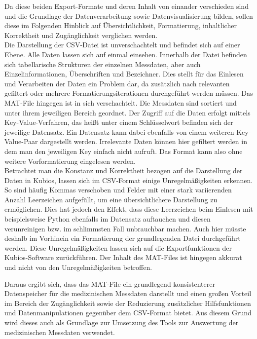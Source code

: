 Da diese beiden Export-Formate und deren Inhalt von einander verschieden sind und die Grundlage der Datenverarbeitung sowie Datenvisualisierung bilden, sollen diese im Folgenden Hinblick auf Übersichtlichkeit, Formatierung, inhaltlicher Korrektheit und Zugänglichkeit verglichen werden.\\
Die Darstellung der CSV-Datei ist unverschachtelt und befindet sich auf einer Ebene. Alle Daten lassen sich auf einmal einsehen. Innerhalb der Datei befinden sich tabellarische Strukturen der einzelnen Messdaten, aber auch Einzelinformationen, Überschriften und Bezeichner. Dies stellt für das Einlesen und Verarbeiten der Daten ein Problem dar, da zusätzlich nach relevanten gefiltert oder mehrere Formatierungsiterationen durchgeführt werden müssen. Das MAT-File hingegen ist in sich verschachtelt. Die Messdaten sind sortiert und unter ihrem jeweiligen Bereich geordnet. Der Zugriff auf die Daten erfolgt mittels Key-Value-Verfahren, das heißt unter einem Schlüsselwort befinden sich der jeweilige Datensatz. Ein Datensatz kann dabei ebenfalls von einem weiteren Key-Value-Paar dargestellt werden. Irrelevante Daten können hier gefiltert werden in dem man den jeweiligen Key einfach nicht aufruft. Das Format kann also ohne weitere Vorformatierung eingelesen werden.\\
Betrachtet man die Konstanz und Korrektheit bezogen auf die Darstellung der Daten in Kubios, lassen sich im CSV-Format einige Unregelmäßigkeiten erkennen. So sind häufig Kommas verschoben und Felder mit einer stark variierenden Anzahl Leerzeichen aufgefüllt, um eine übersichtlichere Darstellung zu ermöglichen. Dies hat jedoch den Effekt, dass diese Leerzeichen beim Einlesen mit beispielsweise Python ebenfalls im Datensatz auftauchen und diesen verunreinigen bzw. im schlimmsten Fall unbrauchbar machen. Auch hier müsste deshalb im Vorhinein ein Formatierung der grundlegenden Datei durchgeführt werden. \color{red}Diese Unregelmäßigkeiten lassen sich auf die Exportfunktionen der Kubios-Software zurückführen. \color{black}Der Inhalt des MAT-Files ist hingegen akkurat und nicht von den Unregelmäßigkeiten betroffen.

Daraus ergibt sich, dass das MAT-File ein grundlegend konsistenterer Datenspeicher für die medizinischen Messdaten darstellt und einen großen Vorteil im Bereich der Zugänglichkeit sowie der Reduzierung zusätzlicher Hilfsfunktionen und Datenmanipulationen gegenüber dem CSV-Format bietet. Aus diesem Grund wird dieses auch als Grundlage zur Umsetzung des Tools zur Auswertung der medizinischen Messdaten verwendet.


